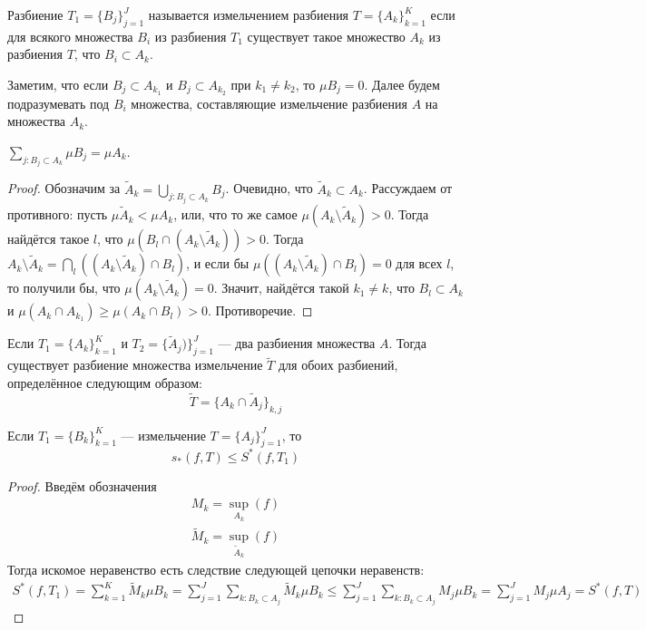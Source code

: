 \begin{Def}
    Разбиение $T_1 = \{B_j\}_{j =1}^{J}$ называется измельчением разбиения $T = \{A_k\}_{k=1}^{K}$ если для всякого множества $B_i$ из разбиения $T_1$ существует такое множество $A_k$ из разбиения $T$, что $B_i \subset A_k$. 
\end{Def}
Заметим, что если $B_j \subset A_{k_1}$ и $B_j \subset A_{k_2}$ при $k_1 \neq k_2$, то $\mu B_j = 0$. Далее будем подразумевать под $B_i$ множества, составляющие измельчение разбиения $A$ на множества $A_k$. 
\begin{Statement}
    $\sum \limits_{j\colon B_j \subset A_k}\mu B_j = \mu A_k$.
\end{Statement}
\begin{proof}
    Обозначим за $\widetilde{A}_k = \bigcup\limits_{j\colon B_j \subset A_k}B_j$. Очевидно, что $\widetilde{A}_k \subset A_k$. Рассуждаем от противного: пусть $\mu \widetilde{A}_k < \mu A_k$, или, что то же самое $ \mu(A_k\setminus \widetilde{A}_k ) > 0$. Тогда найдётся такое $l$, что $\mu (B_l \cap (A_k \setminus \widetilde{A}_k)) > 0$. Тогда $A_k \setminus \widetilde{A}_k = \bigcap\limits_{l}((A_k \setminus \widetilde{A}_k)\cap B_l)$, и если бы $\mu((A_k \setminus \widetilde{A}_k)\cap B_l) = 0$ для всех $l$, то получили бы, что $\mu(A_k \setminus \widetilde{A}_k) = 0$. Значит, найдётся такой $k_1 \neq k$, что $B_l \subset A_k$ и $\mu(A_k \cap A_{k_1}) \geqslant \mu(A_k \cap B_l) > 0$. Противоречие.
\end{proof}
Если $T_1 = \{A_k\}_{k =1}^{K}$ и $T_2 = \{\widetilde{A}_j)\}_{j=1}^{J}$ --- два разбиения множества $A$. Тогда существует разбиение множества измельчение $\widetilde{T}$ для обоих разбиений, определённое следующим образом:
$$
    \widetilde{T} =  \{A_k \cap \widetilde{A}_j\}_{k, j}
$$
\begin{Lemma}
    Если $T_1 = \{B_k\}_{k=1}^{K}$ --- измельчение $T = \{A_j\}_{j =1}^{J}$, то 
    $$
        s_* (f, T) \leqslant S^*(f, T_1)
    $$
\end{Lemma}
\begin{proof}
    Введём обозначения
    \begin{gather}
        M_k = \sup_{A_k}(f)\\
        \widetilde{M}_k = \sup_{\widetilde{A}_k}(f)
    \end{gather}
    Тогда искомое неравенство есть следствие следующей цепочки неравенств:
    \begin{gather}
        S^*(f, T_1) = \sum\limits_{k = 1}^{K}\widetilde{M}_k\mu B_k =  \sum\limits_{j = 1}^{J} \sum\limits_{k\colon B_k \subset A_j} \widetilde{M}_k \mu B_k \leqslant \sum\limits_{j=1}^J  \sum\limits_{k\colon B_k \subset A_j} M_j \mu B_k = \sum\limits_{j=1}^J M_j \mu A_j = S^*(f, T)
    \end{gather}
\end{proof}
